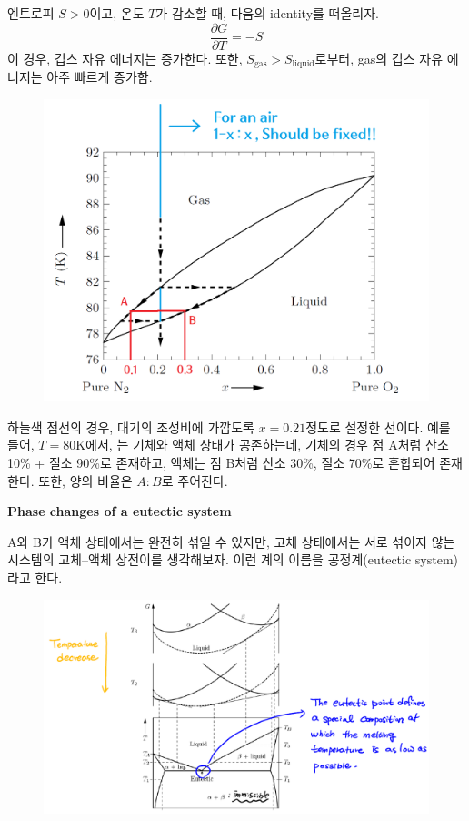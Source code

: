 \documentclass{article}
\begin{document}
엔트로피 $S>0$이고, 온도 $T$가 감소할 때, 다음의 identity를 떠올리자.
\begin{equation}
    \frac{\partial G}{\partial T} = -S
\end{equation}
이 경우, 깁스 자유 에너지는 증가한다. 또한, $S_{\text{gas}} > S_{\text{liquid}}$로부터, gas의 깁스 자유 에너지는 아주 빠르게 증가함.

\newpage

\begin{figure}[h]
    \centering
    \includegraphics[width=0.67\linewidth]{images/fig4_9.png}
\end{figure}
\noindent
하늘색 점선의 경우, 대기의 조성비에 가깝도록 $x=0.21$정도로 설정한 선이다. 예를 들어, $T = 80$K에서, 는 기체와 액체 상태가 공존하는데, 기체의 경우 점 A처럼 산소 10\% + 질소 90\%로 존재하고, 액체는 점 B처럼 산소 30\%, 질소 70\%로 
혼합되어 존재한다. 또한, 양의 비율은 $A : B$로 주어진다.

\vspace{3mm}\noindent
\textbf{Phase changes of a eutectic system}

A와 B가 액체 상태에서는 완전히 섞일 수 있지만, 고체 상태에서는 서로 섞이지 않는 시스템의 고체–액체 상전이를 생각해보자. 이런 계의 이름을 공정계(eutectic system)라고 한다.

\begin{figure}[h]
    \centering
    \includegraphics[width=1\linewidth]{images/fig4_10.png}
\end{figure}
\end{document}
